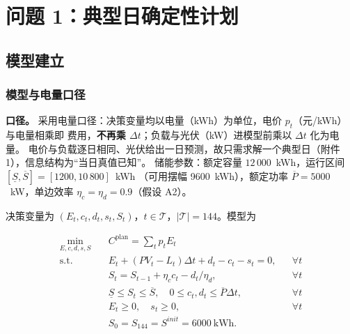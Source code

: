 
\section{问题 1：典型日确定性计划}\label{chap:q1}

\subsection{模型建立}

\subsubsection{模型与电量口径}

\textbf{口径。} 采用电量口径：决策变量均以电量（kWh）为单位，电价 \(p_t\)（元/kWh）与电量相乘即
费用，\textbf{不再乘 \(\Delta t\)}；负载与光伏（kW）进模型前乘以 \(\Delta t\) 化为电量。
电价与负载逐日相同、光伏给出一日预测，故只需求解一个典型日（附件 1），信息结构为“当日真值已知”。
储能参数：额定容量 \(12\,000\)~kWh，运行区间 \([\underline S,\overline S]=[1200,10\,800]\)~kWh
（可用摆幅 9600~kWh），额定功率 \(\overline P=5000\)~kW，单边效率 \(\eta_c=\eta_d=0.9\)（假设 A2）。

决策变量为 \((E_t,c_t,d_t,s_t,S_t)\)，\(t\in\mathcal T\)，\(|\mathcal T|=144\)。模型为

\begin{subequations}\label{eq:q1-model}
\begin{align}
  \min_{E,c,d,s,S}\quad & C^{\text{plan}}=\sum_{t}p_tE_t \label{eq:q1-obj}\\
  \text{s.t.}\quad
  & E_t+(PV_t-L_t)\Delta t+d_t-c_t-s_t=0, && \forall t \label{eq:q1-balance}\\
  & S_t=S_{t-1}+\eta_c c_t-d_t/\eta_d, && \forall t \label{eq:q1-soc}\\
  & \underline S\le S_t\le\overline S,\quad 0\le c_t,d_t\le \overline P\Delta t, && \forall t \label{eq:q1-socbound}\\
  & E_t\ge0,\quad s_t\ge0, && \forall t \label{eq:q1-nonneg}\\
  & S_0=S_{144}=S^{init}=6000\ \text{kWh}. \label{eq:q1-periodic}
\end{align}
\end{subequations}

